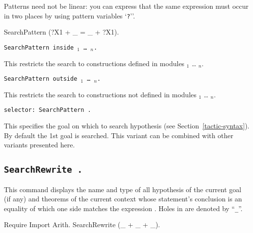 Patterns need not be linear: you can express that the same expression
must occur in two places by using pattern variables `{\texttt
?{\ident}}''.

\begin{coq_example}
SearchPattern (?X1 + _ = _ + ?X1).
\end{coq_example}

\begin{Variants}
\item {\tt SearchPattern {\term} inside
{\module$_1$} \ldots{} {\module$_n$}.}

This restricts the search to constructions defined in modules
{\module$_1$} \ldots{} {\module$_n$}.

\item {\tt SearchPattern {\term} outside {\module$_1$} \ldots{} {\module$_n$}.}

This restricts the search to constructions not defined in modules
{\module$_1$} \ldots{} {\module$_n$}.

\item {\tt selector: SearchPattern {\term}.}

  This specifies the goal on which to search hypothesis (see
  Section~\ref{tactic-syntax}). By default the 1st goal is searched.
  This variant can be combined with other variants presented here.

\end{Variants}

\subsection[\tt SearchRewrite {\term}.]{\tt SearchRewrite {\term}.}

This command displays the name and type of all hypothesis of the
current goal (if any) and theorems of the current context whose
statement's conclusion is an equality of which one side matches the
expression {\term}. Holes in {\term} are denoted by ``{\texttt \_}''.

\begin{coq_example}
Require Import Arith.
SearchRewrite (_ + _ + _).
\end{coq_example}

